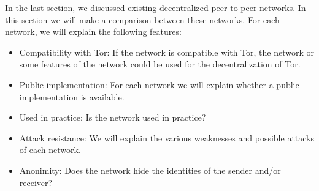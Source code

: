 In the last section, we discussed existing decentralized peer-to-peer networks. In this section we will make a comparison between these networks. For each network, we will explain the following features:

\begin{itemize}
	\item{Compatibility with Tor:} If the network is compatible with Tor, the network or some features of the network could be used for the decentralization of Tor.
	\item{Public implementation:} For each network we will explain whether a public implementation is available.
	\item{Used in practice:} Is the network used in practice?
	\item{Attack resistance:} We will explain the various weaknesses and possible attacks of each network.
	\item{Anonimity:} Does the network hide the identities of the sender and/or receiver?
\end{itemize}